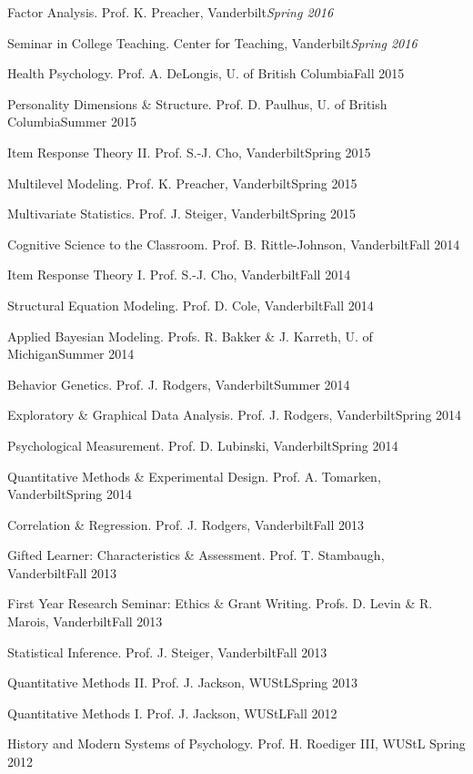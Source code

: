 \begin{etaremune}
\item Factor Analysis. Prof. K. Preacher, Vanderbilt\hfill{\textit{Spring 2016}}
\item Seminar in College Teaching. Center for Teaching, Vanderbilt\hfill{\textit{Spring 2016}}
\item Health Psychology.  Prof. A. DeLongis, U. of British Columbia\hfill{Fall 2015}
\item Personality Dimensions \& Structure.  Prof. D. Paulhus, U. of British Columbia\hfill{Summer 2015}
\item Item Response Theory \textrm{II}. Prof. S.-J. Cho, Vanderbilt\hfill{Spring 2015}
\item Multilevel Modeling. Prof. K. Preacher, Vanderbilt\hfill{Spring 2015}
\item Multivariate Statistics. Prof. J. Steiger, Vanderbilt\hfill{Spring 2015}
\item Cognitive Science to the Classroom. Prof. B. Rittle-Johnson, Vanderbilt\hfill{Fall 2014}
\item Item Response Theory \textrm{I}. Prof. S.-J. Cho, Vanderbilt\hfill{Fall 2014}
\item Structural Equation Modeling. Prof. D. Cole, Vanderbilt\hfill{Fall 2014}
\item Applied Bayesian Modeling. Profs. R. Bakker \& J. Karreth, U. of Michigan\hfill{Summer 2014}
\item Behavior Genetics. Prof. J. Rodgers, Vanderbilt\hfill{Summer 2014}
\item Exploratory \& Graphical Data Analysis. Prof. J. Rodgers, Vanderbilt\hfill{Spring 2014}
\item Psychological Measurement. Prof. D. Lubinski, Vanderbilt\hfill{Spring 2014}
\item Quantitative Methods \& Experimental Design. Prof. A. Tomarken, Vanderbilt\hfill{Spring 2014}
\item Correlation \& Regression. Prof. J. Rodgers, Vanderbilt\hfill{Fall 2013}
\item Gifted Learner: Characteristics \& Assessment. Prof. T. Stambaugh, Vanderbilt\hfill{Fall 2013}
\item First Year Research Seminar: Ethics \& Grant Writing. Profs. D. Levin \& R. Marois, Vanderbilt\hfill{Fall 2013}
\item Statistical Inference. Prof. J. Steiger, Vanderbilt\hfill{Fall 2013}
\item Quantitative Methods \textrm{II}. Prof. J. Jackson, WUStL\hfill{Spring 2013}
\item Quantitative Methods \textrm{I}. Prof. J. Jackson, WUStL\hfill{Fall 2012}
\item History and Modern Systems of Psychology. Prof. H. Roediger \textrm{III}, WUStL \hfill{Spring 2012}\end{etaremune}
